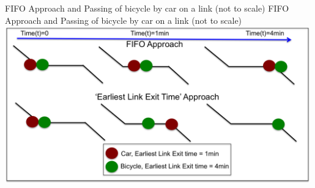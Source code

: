 \createfigure%
{FIFO Approach and Passing of bicycle by car on a link (not to scale)}%
{FIFO Approach and Passing of bicycle by car on a link (not to scale)}%
{\label{fig:patna1}}%
{\includegraphics[width=0.99\textwidth, angle=0]{using/figures/FIFOandPassing}}%
{}


